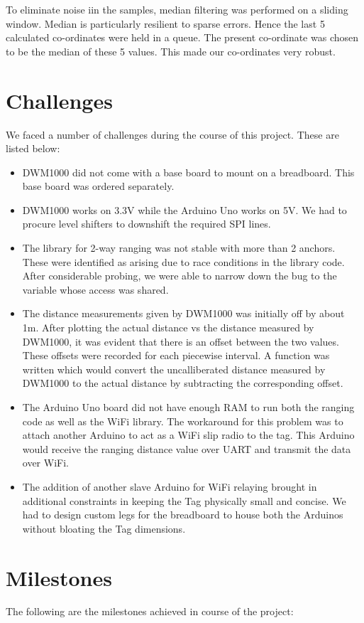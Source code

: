 \documentclass[journal,transmag]{IEEEtran}
\begin{document}
To eliminate noise iin the samples, median filtering was performed on a sliding window. Median is particularly resilient to sparse errors. Hence the last 5 calculated co-ordinates were held in a queue. The present co-ordinate was chosen to be the median of these 5 values. This made our co-ordinates very robust.

\section{Challenges}
We faced a number of challenges during the course of this project.  These are listed below: 

\begin{itemize}
\item DWM1000 did not come with a base board to mount on a breadboard. This base board was ordered separately.
\item DWM1000 works on 3.3V while the Arduino Uno works on 5V. We had to procure level shifters to downshift the required SPI lines.
\item The library for 2-way ranging was not stable with more than 2 anchors. These were identified as arising due to race conditions in the library code. After considerable probing, we were able to narrow down the bug to the variable whose access was shared.
\item The distance measurements given by DWM1000 was initially off by about 1m. After plotting the actual distance vs the distance measured by DWM1000, it was evident that there is an offset between the two values. These offsets were recorded for each piecewise interval. A function was written which would convert the uncalliberated distance measured by DWM1000 to the actual distance by subtracting the corresponding offset.
\item The Arduino Uno board did not have enough RAM to run both the ranging code as well as the WiFi library. The workaround for this problem was to attach another Arduino to act as a WiFi slip radio to the tag. This Arduino would receive the ranging distance value over UART and transmit the data over WiFi.
\item The addition of another slave Arduino for WiFi relaying brought in additional constraints in keeping the Tag physically small and concise. We had to design custom legs for the breadboard to house both the Arduinos without bloating the Tag dimensions.
\end{itemize}

\section{Milestones}
The following are the milestones achieved in course of the project:
\end{document}
